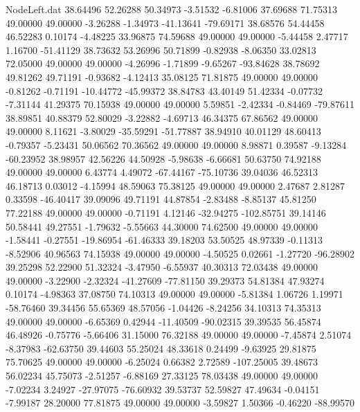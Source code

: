 \begin{filecontents}{NodeLeft.dat}
  38.64496   52.26288   50.34973    -3.51532   -6.81006   37.69688   71.75313   49.00000   49.00000   -3.26288   -1.34973  -41.13641  -79.69171
  38.68576   54.44458   46.52283     0.10174   -4.48225   33.96875   74.59688   49.00000   49.00000   -5.44458    2.47717    1.16700  -51.41129
  38.73632   53.26996   50.71899    -0.82938   -8.06350   33.02813   72.05000   49.00000   49.00000   -4.26996   -1.71899   -9.65267  -93.84628
  38.78692   49.81262   49.71191    -0.93682   -4.12413   35.08125   71.81875   49.00000   49.00000   -0.81262   -0.71191  -10.44772  -45.99372
  38.84783   43.40149   51.42334    -0.07732   -7.31144   41.29375   70.15938   49.00000   49.00000    5.59851   -2.42334   -0.84469  -79.87611
  38.89851   40.88379   52.80029    -3.22882   -4.69713   46.34375   67.86562   49.00000   49.00000    8.11621   -3.80029  -35.59291  -51.77887
  38.94910   40.01129   48.60413    -0.79357   -5.23431   50.06562   70.36562   49.00000   49.00000    8.98871    0.39587   -9.13284  -60.23952
  38.98957   42.56226   44.50928    -5.98638   -6.66681   50.63750   74.92188   49.00000   49.00000    6.43774    4.49072  -67.44167  -75.10736
  39.04036   46.52313   46.18713     0.03012   -4.15994   48.59063   75.38125   49.00000   49.00000    2.47687    2.81287    0.33598  -46.40417
  39.09096   49.71191   44.87854    -2.83488   -8.85137   45.81250   77.22188   49.00000   49.00000   -0.71191    4.12146  -32.94275 -102.85751
  39.14146   50.58441   49.27551    -1.79632   -5.55663   44.30000   74.62500   49.00000   49.00000   -1.58441   -0.27551  -19.86954  -61.46333
  39.18203   53.50525   48.97339    -0.11313   -8.52906   40.96563   74.15938   49.00000   49.00000   -4.50525    0.02661   -1.27720  -96.28902
  39.25298   52.22900   51.32324    -3.47950   -6.55937   40.30313   72.03438   49.00000   49.00000   -3.22900   -2.32324  -41.27609  -77.81150
  39.29373   54.81384   47.93274     0.10174   -4.98363   37.08750   74.10313   49.00000   49.00000   -5.81384    1.06726    1.19971  -58.76460
  39.34456   55.65369   48.57056    -1.04426   -8.24256   34.10313   74.35313   49.00000   49.00000   -6.65369    0.42944  -11.40509  -90.02315
  39.39535   56.45874   46.48926    -0.75776   -5.66406   31.15000   76.32188   49.00000   49.00000   -7.45874    2.51074   -8.37983  -62.63750
  39.44603   55.25024   48.33618     0.24499   -9.63925   29.81875   75.70625   49.00000   49.00000   -6.25024    0.66382    2.72589 -107.25005
  39.48673   56.02234   45.75073    -2.51257   -6.88169   27.33125   78.03438   49.00000   49.00000   -7.02234    3.24927  -27.97075  -76.60932
  39.53737   52.59827   47.49634    -0.04151   -7.99187   28.20000   77.81875   49.00000   49.00000   -3.59827    1.50366   -0.46220  -88.99570

\end{filecontents}
